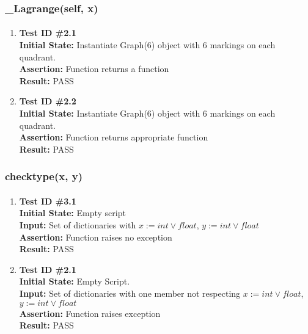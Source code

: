 \documentclass[12pt, titlepage]{article}
\begin{document}
\subsubsection{\_Lagrange(self, x)}		
	\label{sec:4.0.2}
	\paragraph{}
		\begin{enumerate}
			\item{\textbf{Test ID \#2.1\\}}
			\textbf{Initial State:} Instantiate Graph(6) object with 6 markings on each quadrant.\\
			\textbf{Assertion:} Function returns a function \\
			\textbf{Result:} PASS
			
			\item{\textbf{Test ID \#2.2\\}}
			\textbf{Initial State:} Instantiate Graph(6) object with 6 markings on each quadrant.\\
			\textbf{Assertion:} Function returns appropriate function \\
			\textbf{Result:} PASS
		\end{enumerate}

\subsubsection{checktype(x, y)}		
	\label{sec:4.0.3}
	\paragraph{}
		\begin{enumerate}
			\item{\textbf{Test ID \#3.1\\}}
			\textbf{Initial State:} Empty script\\
			\textbf{Input:} Set of dictionaries with $x:= int \vee float$, $y:= int \vee float$ \\
			\textbf{Assertion:} Function raises no exception \\
			\textbf{Result:} PASS
			
			\item{\textbf{Test ID \#2.1\\}}
			\textbf{Initial State:} Empty Script.\\
			\textbf{Input:} Set of dictionaries with one member not respecting $x:= int \vee float$, $y:= int \vee float$ \\
			\textbf{Assertion:} Function raises exception \\
			\textbf{Result:} PASS
		\end{enumerate}
		
\end{document}
